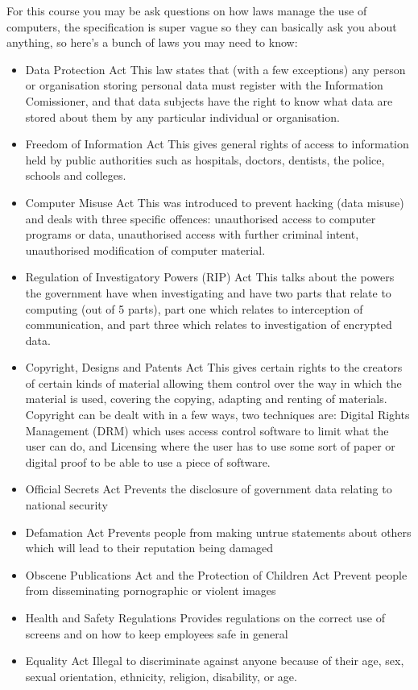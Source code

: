   For this course you may be ask questions on how laws manage the use of computers, the specification is super vague so they can basically ask you about anything, so here's a bunch of laws you may need to know:
  \begin{itemize}
    \setlength{\itemsep}{0em}
    \item Data Protection Act
      \subitem This law states that (with a few exceptions) any person or organisation storing personal data must register with the Information Comissioner, and that data subjects have the right to know what data are stored about them by any particular individual or organisation.
    \item Freedom of Information Act
      \subitem This gives general rights of access to information held by public authorities such as hospitals, doctors, dentists, the police, schools and colleges.
    \item Computer Misuse Act
      \subitem This was introduced to prevent hacking (data misuse) and deals with three specific offences: unauthorised access to computer programs or data, unauthorised access with further criminal intent, unauthorised modification of computer material.
    \item Regulation of Investigatory Powers (RIP) Act
      \subitem This talks about the powers the government have when investigating and have two parts that relate to computing (out of 5 parts), part one which relates to interception of communication, and part three which relates to investigation of encrypted data.
    \item Copyright, Designs and Patents Act
      \subitem This gives certain rights to the creators of certain kinds of material allowing them control over the way in which the material is used, covering the copying, adapting and renting of materials.
      \subitem Copyright can be dealt with in a few ways, two techniques are: Digital Rights Management (DRM) which uses access control software to limit what the user can do, and Licensing where the user has to use some sort of paper or digital proof to be able to use a piece of software.
    \item Official Secrets Act
      \subitem  Prevents the disclosure of government data relating to national security
    \item Defamation Act
      \subitem Prevents people from making untrue statements about others which will lead to their reputation being damaged
    \item Obscene Publications Act and the Protection of Children Act
      \subitem Prevent people from disseminating pornographic or violent images
    \item Health and Safety Regulations
      \subitem Provides regulations on the correct use of screens and on how to keep employees safe in general
    \item Equality Act
      \subitem Illegal to discriminate against anyone because of their age, sex, sexual orientation, ethnicity, religion, disability, or age.
  \end{itemize}
